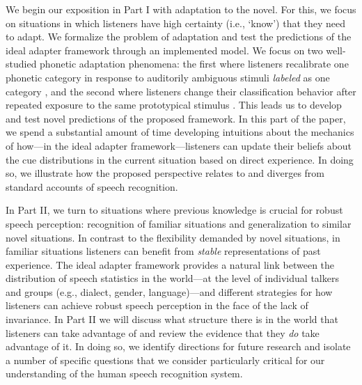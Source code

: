 \label{r2-outline-parts}
We begin our exposition in Part I with adaptation to the novel. For this, we focus on situations in which listeners have high certainty (i.e., `know') that they need to adapt. We formalize the problem of adaptation and test the predictions of the ideal adapter framework through an implemented model.  We focus on two well-studied phonetic adaptation phenomena: the first where listeners recalibrate one phonetic category in response to auditorily ambiguous stimuli {\em labeled} as one category \autocite[perceptual recalibration or phonetic adaptation,][]{Bertelson2003,Kraljic2005,Norris2003}, and the second where listeners change their classification behavior after repeated exposure to the same prototypical stimulus \autocite[selective adaptation,][]{Eimas1973,Samuel1986}. This leads us to develop and test novel predictions of the proposed framework. In this part of the paper, we spend a substantial amount of time developing intuitions about the mechanics of how---in the ideal adapter framework---listeners can update their beliefs about the cue distributions in the current situation based on direct experience. In doing so, we illustrate how the proposed perspective relates to and diverges from standard accounts of speech recognition.

In Part II, we turn to situations where previous knowledge is crucial for robust speech perception: recognition of familiar situations and generalization to similar novel situations.  In contrast to the flexibility demanded by novel situations, in familiar situations listeners can benefit from \emph{stable} representations of past experience.  The ideal adapter framework provides a natural link between the distribution of speech statistics in the world---at the level of individual talkers and groups (e.g., dialect, gender, language)---and different strategies for how listeners can achieve robust speech perception in the face of the lack of invariance.  In Part II we will discuss what structure there is in the world that listeners can take advantage of and review the evidence that they \emph{do} take advantage of it. In doing so, we identify directions for future research and isolate a number of specific questions that we consider particularly critical for our understanding of the human speech recognition system.


